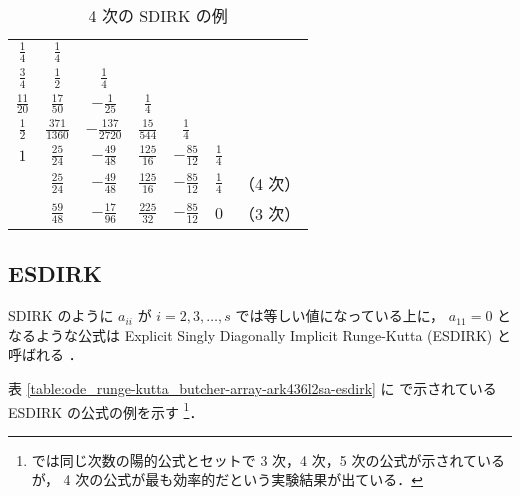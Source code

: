 \begin{table}[bp]
    \caption{4 次の SDIRK の例 \cite[Section IV.6.]{Hairer1991}}
    \label{table:ode_runge-kutta_butcher-array-sdirk-4}
    \centering
    \begin{tabular}{c|cccccc}
        $\frac{1}{4}$   & $\frac{1}{4}$      &                     &                  &                  &               &       \\
        $\frac{3}{4}$   & $\frac{1}{2}$      & $\frac{1}{4}$       &                  &                  &               &       \\
        $\frac{11}{20}$ & $\frac{17}{50}$    & $-\frac{1}{25}$     & $\frac{1}{4}$    &                  &               &       \\
        $\frac{1}{2}$   & $\frac{371}{1360}$ & $-\frac{137}{2720}$ & $\frac{15}{544}$ & $\frac{1}{4}$    &               &       \\
        $1$             & $\frac{25}{24}$    & $-\frac{49}{48}$    & $\frac{125}{16}$ & $-\frac{85}{12}$ & $\frac{1}{4}$ &       \\
        \hline
                        & $\frac{25}{24}$    & $-\frac{49}{48}$    & $\frac{125}{16}$ & $-\frac{85}{12}$ & $\frac{1}{4}$ & （4 次） \\
                        & $\frac{59}{48}$    & $-\frac{17}{96}$    & $\frac{225}{32}$ & $-\frac{85}{12}$ & $0$           & （3 次）
    \end{tabular}
\end{table}

\subsection{ESDIRK}

SDIRK のように $a_{ii}$ が $i = 2, 3, \ldots, s$ では等しい値になっている上に，
$a_{11} = 0$ となるような公式は
Explicit Singly Diagonally Implicit Runge-Kutta (ESDIRK) と呼ばれる
\cite{Jorgensen2018}．

表 \ref{table:ode_runge-kutta_butcher-array-ark436l2sa-esdirk} に
\cite{Kennedy2003} で示されている ESDIRK の公式の例を示す
\footnote{\cite{Kennedy2003} では同じ次数の陽的公式とセットで%
    3 次，4 次，5 次の公式が示されているが，%
    4 次の公式が最も効率的だという実験結果が出ている．}．

